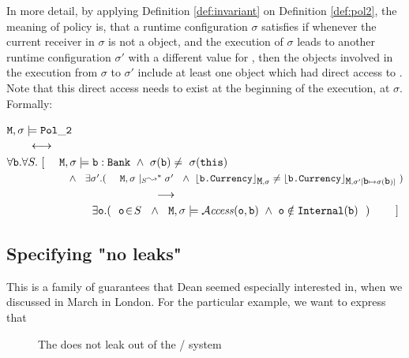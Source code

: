 In more detail, by applying  Definition \ref{def:invariant} on Definition \ref{def:pol2}, the  meaning of policy 
  is, that a runtime configuration $\sigma$ satisfies    if whenever the current receiver in $\sigma$
 is not a  object, and the execution of $\sigma$ leads to another runtime configuration $\sigma'$
 with a different value for , then the objects involved in the execution from
 $\sigma$ to $\sigma'$ include at least one object which had direct access to .
 Note that this direct access needs to exist at the beginning of   the execution, \ie at $\sigma$.
 Formally:

 \noindent
 ${\mbox{\tt{M}}}, \sigma \models  {\ensuremath{{\mbox{\tt{Pol}}}\_{{\mbox{\tt{2}}}}}}$\\$ \strut \ \ \ \  \ \  \longleftrightarrow $\\
 $\forall {\mbox{\tt{b}}}.\forall S.\ [ \ \ \ \ {\mbox{\tt{M}}}, \sigma \models {\mbox{\tt{b}}}:{\mbox{\tt{Bank}}}\ \wedge\
 \sigma({\mbox{\tt{b}}})\neq \ \sigma({\mbox{\tt{this}}}) $\\
 $\strut \hspace{2.1cm}  \wedge \
 \ \exists\sigma'.(\ \ \ \ {\mbox{\tt{M}}}, \sigma\mid_S \leadsto^* \sigma'\
\ \wedge\ {\lfloor{ {{\mbox{\tt{b.Currency}}}}}\rfloor_{{\mbox{\tt{M}}},\sigma}}\neq {\ensuremath{\lfloor{ {{\mbox{\tt{b.Currency}}}}}\rfloor_{{\mbox{\tt{M}}},\sigma'[{\mbox{\tt{b}}}\mapsto\sigma({\mbox{\tt{b}}})]}}}\ )$\\
$\strut \hspace{4.7cm} \longrightarrow$ \\
 $\strut \hspace{2.7cm}  %
 \exists \prg{o}. (\ \ \prg{o} \!\in\!S\ \
  \wedge \ \ \M, \sigma \models \CanAccess{\prg{o}}{\prg{b} }\ \wedge \  \prg{o}\notin \prg{Internal}(\prg{b}) \   \ ) \ \ \ \ \ \ \  ]$



\subsection{Specifying  "no leaks"}

This is a family of guarantees that Dean seemed especially interested in, when we discussed in March in London.
For the particular example, we want to express that

\begin{description}
\item[\Pol 7]
The  does not leak out of the \prg{Bank}/ system
\end{description}

